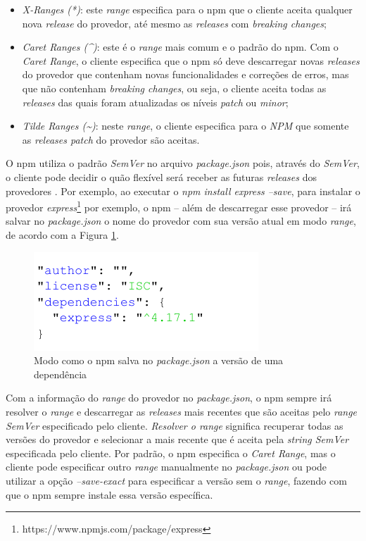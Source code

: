 \begin{itemize}
    \item \textit{X-Ranges (*)}: este \textit{range} especifica para o \gls{npm} que o cliente aceita qualquer nova \textit{release} do provedor, até mesmo as \textit{releases} com \textit{breaking changes};
    \item \textit{Caret Ranges (\textasciicircum)}: este é o \textit{range} mais comum e o padrão do \gls{npm}. Com o \textit{Caret Range}, o cliente especifica que o \gls{npm} só deve descarregar novas \textit{releases} do provedor que contenham novas funcionalidades e correções de erros, mas que não contenham \textit{breaking changes}, ou seja, o cliente aceita todas as \textit{releases} das quais foram atualizadas os níveis \textit{patch} ou \textit{minor};
    \item \textit{Tilde Ranges (\textasciitilde)}: neste \textit{range}, o cliente especifica para o \textit{NPM} que somente as \textit{releases patch} do provedor são aceitas.
\end{itemize}{}

O \gls{npm} utiliza o padrão \textit{SemVer} no arquivo \textit{package.json} pois, através do \textit{SemVer}, o cliente pode decidir o quão flexível será receber as futuras \textit{releases} dos provedores \cite{decan}. Por exemplo, ao executar o \textit{npm install express --save}, para instalar o provedor \textit{express}\footnote{https://www.npmjs.com/package/express} por exemplo, o \gls{npm} -- além de descarregar esse provedor -- irá salvar no \textit{package.json} o nome do provedor com sua versão atual em modo \textit{range}, de acordo com a Figura \ref{fig:dep_express}.

\begin{figure}
    \centering
    \includegraphics[scale=1.3]{figuras/dependencies_express.pdf}
    \caption{Modo como o \gls{npm} salva no \textit{package.json} a versão de uma dependência}
    \label{fig:dep_express}
\end{figure}{}

Com a informação do \textit{range} do provedor no \textit{package.json}, o \gls{npm} sempre irá resolver o \textit{range} e descarregar as \textit{releases} mais recentes que são aceitas pelo \textit{range SemVer} especificado pelo cliente. \textit{Resolver o range} significa recuperar todas as versões do provedor e selecionar a mais recente que é aceita pela \textit{string SemVer} especificada pelo cliente. Por padrão, o \gls{npm} especifica o \textit{Caret Range}, mas o cliente pode especificar outro \textit{range} manualmente no \textit{package.json} ou pode utilizar a opção \textit{--save-exact} para especificar a versão sem o \textit{range}, fazendo com que o \gls{npm} sempre instale essa versão específica.

